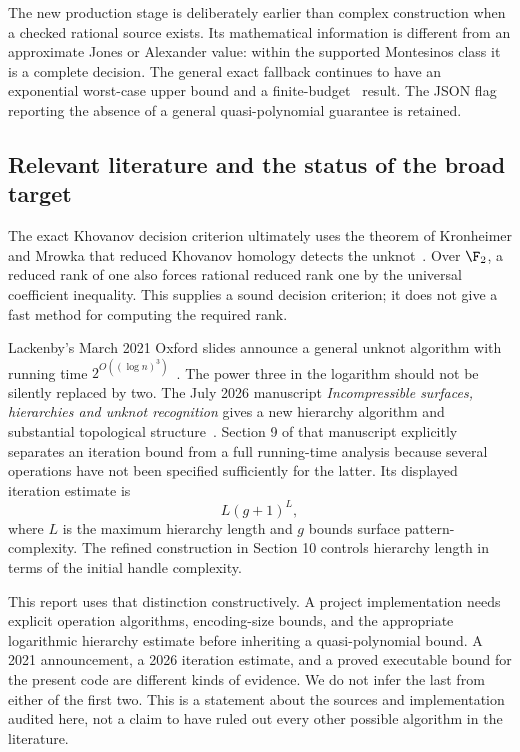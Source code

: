 The new production stage is deliberately earlier than complex construction
when a checked rational source exists. Its mathematical information is
different from an approximate Jones or Alexander value: within the supported
Montesinos class it is a complete decision. The general exact fallback
continues to have an exponential worst-case upper bound and a finite-budget
\unknown\ result. The JSON flag reporting the absence of a general
quasi-polynomial guarantee is retained.

\subsection{Relevant literature and the status of the broad target}
\label{subsec:literature-status}

The exact Khovanov decision criterion ultimately uses the theorem of
Kronheimer and Mrowka that reduced Khovanov homology detects the
unknot~\cite{kronheimer-mrowka}. Over \(\F_2\), a reduced rank of one also
forces rational reduced rank one by the universal coefficient inequality.
This supplies a sound decision criterion; it does not give a fast method
for computing the required rank.

Lackenby's March 2021 Oxford slides announce a general unknot algorithm
with running time \(2^{O((\log n)^3)}\)~\cite{lackenby-2021}.
The power three in the logarithm should not be silently replaced by two.
The July 2026 manuscript \emph{Incompressible surfaces, hierarchies and
unknot recognition} gives a new hierarchy algorithm and substantial
topological structure~\cite{lackenby-2026}. Section 9 of that manuscript
explicitly separates an iteration bound from a full running-time analysis
because several operations have not been specified sufficiently for the
latter. Its displayed iteration estimate is
\[
 L(g+1)^L,
\]
where \(L\) is the maximum hierarchy length and \(g\) bounds surface
pattern-complexity. The refined construction in Section 10 controls
hierarchy length in terms of the initial handle complexity.

This report uses that distinction constructively. A project implementation
needs explicit operation algorithms, encoding-size bounds, and the
appropriate logarithmic hierarchy estimate before inheriting a
quasi-polynomial bound. A 2021 announcement, a 2026 iteration estimate,
and a proved executable bound for the present code are different kinds
of evidence. We do not infer the last from either of the first two.
This is a statement about the sources and implementation audited here,
not a claim to have ruled out every other possible algorithm in the
literature.

